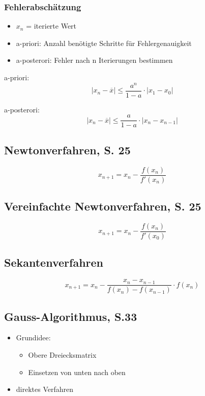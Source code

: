 \subsubsection{Fehlerabschätzung}

\begin{itemize}
\item $x_n$ = iterierte Wert
\item a-priori: Anzahl benötigte Schritte für Fehlergenauigkeit
\item a-posterori: Fehler nach n Iterierungen bestimmen
\end{itemize}

a-priori:
\[|x_n - \overline{x}| \leq{} \frac{a^n}{1 - a} \cdot |x_1 - x_0|\]

a-posterori:
\[|x_n - \overline{x}| \leq{} \frac{a}{1 - a} \cdot |x_n - x_{n-1}|\]

\subsection{Newtonverfahren, S. 25}

\[x_{n+1} = x_n - \frac{f(x_n)}{f'(x_n)}\]

\subsection{Vereinfachte Newtonverfahren, S. 25}

\[x_{n+1} = x_n - \frac{f(x_n)}{f'(x_0)}\]

\subsection{Sekantenverfahren}

\[x_{n+1} = x_n - \frac{x_n-x_{n-1}}{f(x_n) - f(x_{n-1})} \cdot f(x_n)\]


\subsection{Gauss-Algorithmus, S.33}
\begin{itemize}
\item Grundidee:
\begin{itemize}
\item Obere Dreiecksmatrix
\item Einsetzen von unten nach oben
\end{itemize}
\item direktes Verfahren
\end{itemize}


